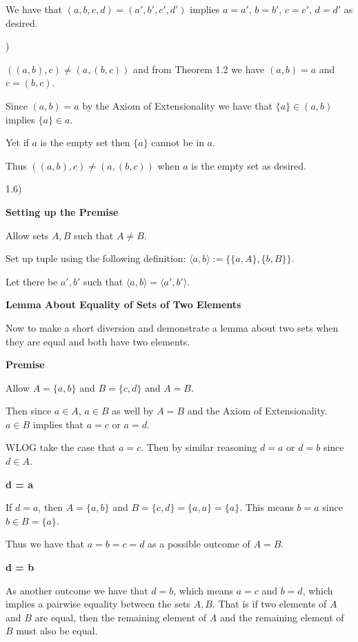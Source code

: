 \documentclass{article}
\begin{document}
We have that $(a,b,c,d) = (a',b',c',d')$ implies $a = a'$, $b = b'$, $c = c'$, $d = d'$ as desired.

)

\medskip
$((a,b),c) \neq (a,(b,c))$ and from Theorem 1.2 we have $(a,b) = a$ and $c = (b,c)$. 

\medskip

Since $(a,b) = a$ by the Axiom of Extensionality we have that $\{a\} \in (a,b)$ implies $\{a\} \in a$. 

\medskip

Yet if $a$ is the empty set then $\{a\}$ cannot be in $a$.

\medskip

Thus $((a,b),c) \neq (a,(b,c))$ when $a$ is the empty set as desired.

\bigskip

1.6)

\medskip
\textbf{Setting up the Premise}
\medskip

Allow sets $A,B$ such that $A \neq B$.


Set up tuple using the following definition:
$\langle a,b \rangle := \{\{a, A\}, \{b, B\}\}$.

\medskip

Let there be $a',b'$ such that $\langle a,b \rangle = \langle a',b' \rangle$.

\medskip
\textbf{Lemma About Equality of Sets of Two Elements}
\medskip

Now to make a short diversion and demonstrate a lemma about two sets when they are equal and both have two elements. 

\medskip
\textbf{Premise}
\medskip

Allow $A = \{a,b\}$ and $B = \{c,d\}$ and $A = B$. 

\medskip
Then since $a \in A$, $a \in B$ as well by $A = B$ and the Axiom of Extensionality. $a \in B$ implies that $a = c$ or $a = d$. 

\medskip
WLOG take the case that $a = c$. Then by similar reasoning $d = a$ or $d = b$ since $d \in A$.

\medskip
\textbf{d = a}
\medskip

If $d = a$, then $A = \{a,b\}$ and $B = \{c,d\} = \{a,a\} = \{a\}$. This means $b = a$ since $b \in B = \{a\}$.

\medskip
Thus we have that $a = b = c = d$ as a possible outcome of $A = B$.

\medskip
\textbf{d = b}
\medskip

As another outcome we have that $d = b$, which means $a = c$ and $b = d$, which implies a pairwise equality between the sets $A,B$. That is if two elements of $A$ and $B$ are equal, then the remaining element of $A$ and the remaining element of $B$ must also be equal.
\end{document}
